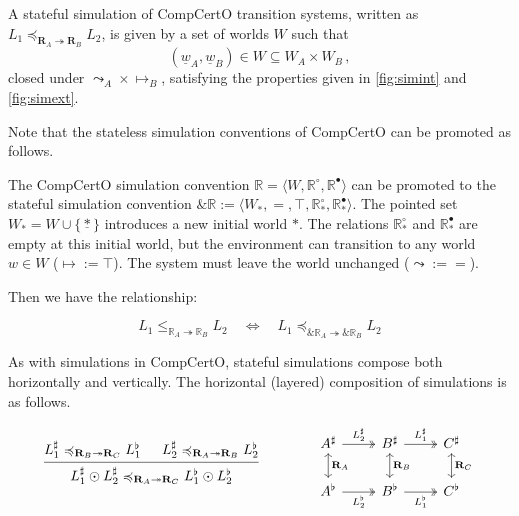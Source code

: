 \documentclass[acmsmall,screen,review,anonymous]{acmart}
\newcommand{\que}{\circ}
\newcommand{\ans}{\bullet}
\renewcommand{\preceq}{\preccurlyeq}
\newcommand{\intl}[1]{\underline{#1}}
\begin{document}
\begin{definition}
A stateful simulation of CompCertO transition systems,
written as
$L_1 \preceq_{\mathbf{R}_A \twoheadrightarrow \mathbf{R}_B} L_2$,
is given by a set of worlds $W$ such that
\[ (\intl{w}_A, \intl{w}_B) \in W \subseteq W_A \times W_B \,, \]
closed under ${\leadsto_A} \times {\mapsto_B}$,
satisfying the properties given in
\autoref{fig:simint} and
\autoref{fig:simext}.
\end{definition}

Note that the stateless simulation conventions of CompCertO
can be promoted as follows.

\begin{definition}
The CompCertO simulation convention
$\mathbb{R} = \langle W, \mathbb{R}^\que, \mathbb{R}^\ans \rangle$
can be promoted to the stateful simulation convention
$\&\mathbb{R} :=
 \langle W_*, {=}, \top, \mathbb{R}^\que_*, \mathbb{R}^\ans_* \rangle$.
The pointed set $W_* = W \cup \{ \intl{*} \}$
introduces a new initial world $*$.
The relations $\mathbb{R}^\que_*$ and $\mathbb{R}^\ans_*$
are empty at this initial world,
but the environment can transition
to any world $w \in W$ (${\mapsto} := \top$).
The system must leave the world unchanged (${\leadsto} := {=}$).
\end{definition}

Then we have the relationship:
\begin{lemma}
\[
  L_1 \le_{\mathbb{R}_A \twoheadrightarrow \mathbb{R}_B} L_2
  \quad \Leftrightarrow \quad
  L_1 \preceq_{\&\mathbb{R}_A \twoheadrightarrow \&\mathbb{R}_B} L_2
\]
\end{lemma}

As with simulations in CompCertO,
stateful simulations compose both horizontally and vertically.
The horizontal (layered) composition of simulations
is as follows.

\begin{lemma}
\[
  \begin{prooftree}
    \hypo{
      L_1^\sharp
      \preceq_{\mathbf{R}_B \twoheadrightarrow \mathbf{R}_C}
      L_1^\flat}
    \hypo{
      L_2^\sharp
      \preceq_{\mathbf{R}_A \twoheadrightarrow \mathbf{R}_B}
      L_2^\flat}
    \infer2{
      L_1^\sharp \odot L_2^\sharp
      \preceq_{\mathbf{R}_A \twoheadrightarrow \mathbf{R}_C}
      L_1^\flat \odot L_2^\flat}
  \end{prooftree}
  \qquad \qquad
  \begin{tikzcd}
    A^\sharp \ar[r, twoheadrightarrow, "L_2^\sharp"]
	     \ar[d, leftrightarrow, "\mathbf{R}_A"] &
    B^\sharp \ar[r, twoheadrightarrow, "L_1^\sharp"]
	     \ar[d, leftrightarrow, "\mathbf{R}_B"] &
    C^\sharp \ar[d, leftrightarrow, "\mathbf{R}_C"]
    \\
    A^\flat \ar[r, twoheadrightarrow, "L_2^\flat"'] &
    B^\flat \ar[r, twoheadrightarrow, "L_1^\flat"'] &
    C^\flat
  \end{tikzcd}
\]
\end{lemma}
\end{document}
